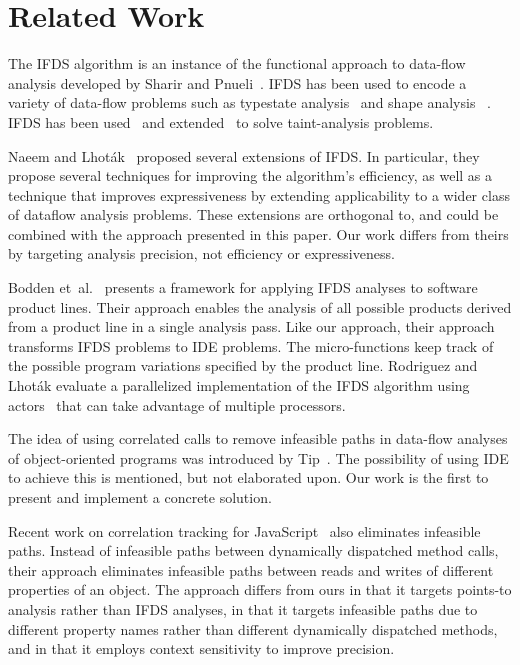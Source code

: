 \section{Related Work}
  \label{sec:Related}
The IFDS algorithm is an instance of the functional approach to data-flow analysis developed by Sharir and Pnueli~\cite{pnueli1981two}.
IFDS has been used to encode a variety of data-flow problems such as typestate analysis~\cite{naeem2008typestate,DBLP:conf/pldi/ZhangMGNY14} and shape analysis%
~\cite{DBLP:conf/birthday/KreikerRRSWY13}. IFDS has been used~\cite{DBLP:conf/pldi/ArztRFBBKTOM14,tripp2009taj} and extended~\cite{DBLP:conf/sigsoft/LerchHBM14} to solve taint-analysis problems.

Naeem and Lhot\'ak~\cite{naeem2010pei} proposed several extensions of IFDS.
In particular, they propose several techniques for improving the algorithm's 
efficiency, as well as a technique that improves expressiveness by extending
applicability to a wider class of dataflow analysis problems. 
These extensions are orthogonal to, and could be combined with the approach
presented in this paper. Our work differs from theirs by targeting
analysis precision, not efficiency or expressiveness.

Bodden et~al.~\cite{bodden2013spl} presents a framework
for applying IFDS analyses to software product lines. Their approach enables the analysis of
all possible products derived from a product line in a single analysis pass. Like our approach,
their approach transforms IFDS problems to IDE problems. The micro-functions keep track
of the possible program variations specified by the product line.
Rodriguez and Lhot\'ak evaluate a parallelized implementation of the IFDS algorithm using actors~\cite{rodriguez2010concurrent} that can take advantage of multiple processors.

The idea of using correlated calls to remove infeasible paths in data-flow analyses of object-oriented programs 
was introduced by Tip~\cite{DBLP:journals/scp/Tip15}. The possibility of using IDE to achieve this is mentioned, 
but not elaborated upon. Our work is the first to present and implement a concrete solution.

Recent work on correlation tracking for JavaScript~\cite{DBLP:conf/ecoop/SridharanDCST12} 
also eliminates infeasible paths. Instead of infeasible paths
between dynamically dispatched method calls, their approach eliminates
infeasible paths between reads and writes of different properties
of an object. 
The approach differs from ours in that it targets points-to analysis rather
than IFDS analyses, in that it targets infeasible paths due to different
property names rather than different dynamically dispatched methods,
and in that it employs context sensitivity to improve precision.

